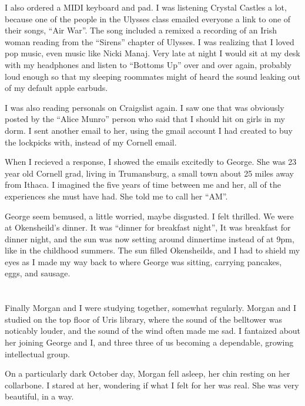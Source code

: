 I also ordered a MIDI keyboard and pad.  I was listening Crystal Castles a lot,
because one of the people in the Ulysses class emailed everyone a link to one of
their songs, ``Air War''.  The song included a remixed a recording of an Irish
woman reading from the ``Sirens'' chapter of Ulysses.  I was realizing that I
loved pop music, even music like Nicki Manaj.  Very late at night I would sit at
my desk with my headphones and listen to ``Bottoms Up'' over and over again,
probably loud enough so that my sleeping roommates might of heard the sound
leaking out of my default apple earbuds.  

I was also reading personals on Craigslist again.  I saw one that was obviously
posted by the ``Alice Munro'' person who said that I should hit on girls in my
dorm.  I sent another email to her, using the gmail account I had created to buy
the lockpicks with, instead of my Cornell email.

When I recieved a response, I showed the emails excitedly to George.  She
was 23 year old Cornell grad, living in Trumansburg, a small town about 25 miles
away from Ithaca.  I imagined the five years of time between me and her, all of
the experiences she must have had.  She told me to call her ``AM''.

George seem bemused, a little worried, maybe disgusted.  I felt thrilled.  We
were at Okensheild's dinner.  It was ``dinner for breakfast night'',   It
was breakfast for dinner night, and the sun was now setting around dinnertime
instead of at 9pm, like in the childhood summers.  The sun filled Okensheilds,
and I had to shield my eyes as I made my way back to where George was sitting,
carrying pancakes, eggs, and sausage. 

\section{}

Finally Morgan and I were studying together, somewhat regularly.   Morgan and I
studied on the top floor of Uris library, where the sound of the belltower was
noticably louder, and the sound of the wind often made me sad.  I fantaized
about her joining George and I, and three three of us becoming a dependable,
growing intellectual group. 

On a particularly dark October day, Morgan fell asleep, her chin resting on her
collarbone.  I stared at her, wondering if what I felt for her was real.  She
was very beautiful, in a way.  

